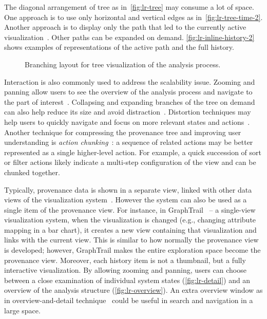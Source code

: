 The diagonal arrangement of tree as in~\autoref{fig:lr-tree} may consume a lot of space. One approach is to use only horizontal and vertical edges as in~\autoref{fig:lr-tree-time-2}. Another approach is to display only the path that led to the currently active  visualization~\cite{Klemmer2002}. Other paths can be expanded on demand. \autoref{fig:lr-inline-history-2} shows examples of representations of the active path and the full history.

\begin{figure}[!htb]
\centering
{}
\hfill
{}
\caption{Branching layout for tree visualization of the analysis process. }
\end{figure}

Interaction is also commonly used to address the scalability issue. Zooming and panning allow users to see the overview of the analysis process and navigate to the part of interest~\cite{Dunne2012}. Collapsing and expanding branches of the tree on demand can also help reduce its size and avoid distraction~\cite{Bavoil2005}. Distortion techniques may help users to quickly navigate and focus on more relevant states and actions~\cite{Meng1998}. Another technique for compressing the provenance tree and improving user understanding is \emph{action chunking}~\cite{Heer2008}: a sequence of related actions may be better represented as a single higher-level action. For example, a quick succession of sort or filter actions likely indicate a multi-step configuration of the view and can be chunked together.

Typically, provenance data is shown in a separate view, linked with other data views of the visualization system~\cite{Shrinivasan2008,Heer2008,Pike2009,Kadivar2009}. However the system can also be used as a single item of the provenance view. For instance, in GraphTrail~\cite{Dunne2012} -- a single-view visualization system, when the visualization is changed (e.g., changing attribute mapping in a bar chart), it creates a new view containing that visualization and links with the current view. This is similar to how normally the provenance view is developed; however, GraphTrail makes the entire exploration space become the provenance view. Moreover, each history item is not a thumbnail, but a fully interactive visualization. By allowing zooming and panning, users can choose between a close examination of individual system states (\autoref{fig:lr-detail}) and an overview of the analysis structure (\autoref{fig:lr-overview}). An extra overview window as in overview-and-detail technique~\cite{Cockburn2008} could be useful in search and navigation in a large space.

